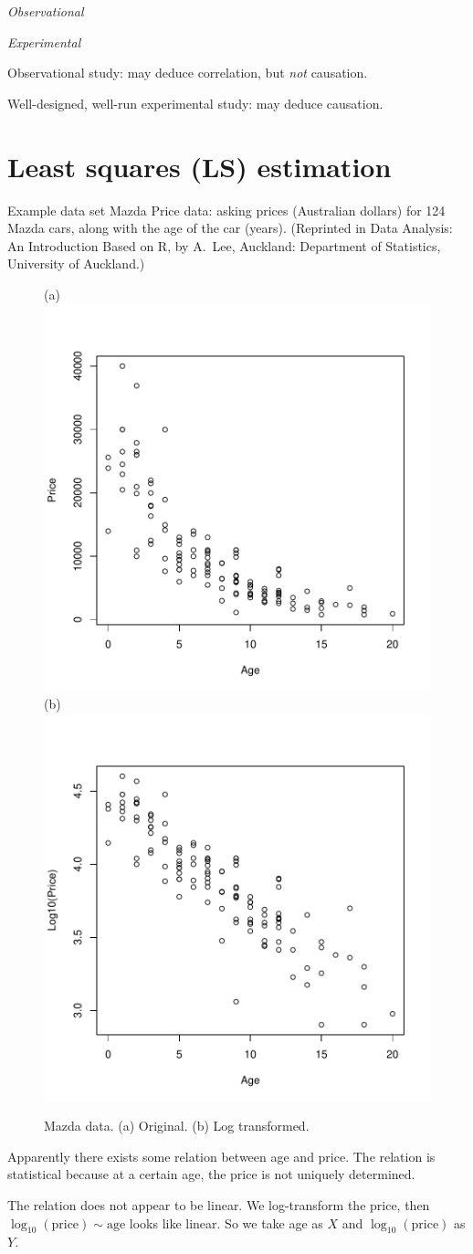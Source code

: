 \documentclass[12pt]{article}
\begin{document}
\emph{Observational}

\emph{Experimental}

Observational study: may deduce correlation, but \emph{not} causation.

Well-designed, well-run experimental study: may deduce causation.

\section{Least squares (LS) estimation}
\label{sec:ls}

\textsf{Example data set} Mazda Price data: asking prices (Australian dollars) for 124 Mazda
cars, along with the age of the car (years). (Reprinted in Data
Analysis: An Introduction Based on R, by A.~Lee, Auckland: Department of
Statistics, University of Auckland.)

\begin{figure}
(a)
\includegraphics[width=.42\textwidth]{fig_mazda_raw.pdf}
(b)
\includegraphics[width=.42\textwidth]{fig_mazda_log_transformed.pdf}
\caption{Mazda data. (a) Original. (b) Log transformed.}
\label{fig:mazda-data}
\end{figure}

Apparently there exists some relation between age and price.
The relation is statistical because at a certain age,
the price is not uniquely determined.

The relation does not appear to be linear.
We log-transform the price, then
\mbox{$\log_{10}(\text{price}) \sim \text{age}$}
looks like linear.
So we take age as $X$ and $\log_{10}(\text{price})$ as $Y$.
\end{document}
